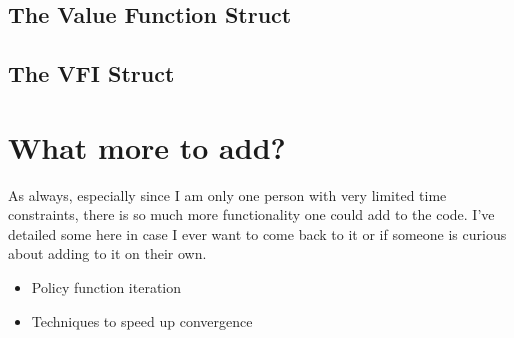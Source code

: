 \documentclass[11pt,english]{article}
\begin{document}
\subsection{The Value Function Struct}

\subsection{The VFI Struct}

\section{What more to add?}

As always, especially since I am only one person with very limited time constraints, there is so much more functionality one could add to the code. I've detailed some here in case I ever want to come back to it or if someone is curious about adding to it on their own.
\begin{itemize}
	\item Policy function iteration

	\item Techniques to speed up convergence

\end{itemize}
\end{document}
